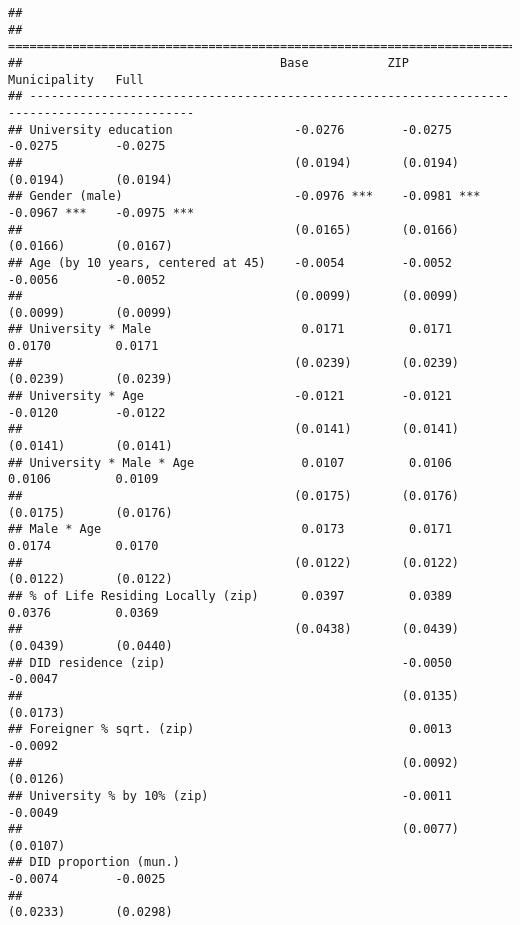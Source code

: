 \documentclass[
]{article}
\begin{document}
\begin{verbatim}
## 
## =============================================================================================
##                                    Base           ZIP            Municipality   Full         
## ---------------------------------------------------------------------------------------------
## University education                 -0.0276        -0.0275        -0.0275        -0.0275    
##                                      (0.0194)       (0.0194)       (0.0194)       (0.0194)   
## Gender (male)                        -0.0976 ***    -0.0981 ***    -0.0967 ***    -0.0975 ***
##                                      (0.0165)       (0.0166)       (0.0166)       (0.0167)   
## Age (by 10 years, centered at 45)    -0.0054        -0.0052        -0.0056        -0.0052    
##                                      (0.0099)       (0.0099)       (0.0099)       (0.0099)   
## University * Male                     0.0171         0.0171         0.0170         0.0171    
##                                      (0.0239)       (0.0239)       (0.0239)       (0.0239)   
## University * Age                     -0.0121        -0.0121        -0.0120        -0.0122    
##                                      (0.0141)       (0.0141)       (0.0141)       (0.0141)   
## University * Male * Age               0.0107         0.0106         0.0106         0.0109    
##                                      (0.0175)       (0.0176)       (0.0175)       (0.0176)   
## Male * Age                            0.0173         0.0171         0.0174         0.0170    
##                                      (0.0122)       (0.0122)       (0.0122)       (0.0122)   
## % of Life Residing Locally (zip)      0.0397         0.0389         0.0376         0.0369    
##                                      (0.0438)       (0.0439)       (0.0439)       (0.0440)   
## DID residence (zip)                                 -0.0050                       -0.0047    
##                                                     (0.0135)                      (0.0173)   
## Foreigner % sqrt. (zip)                              0.0013                       -0.0092    
##                                                     (0.0092)                      (0.0126)   
## University % by 10% (zip)                           -0.0011                       -0.0049    
##                                                     (0.0077)                      (0.0107)   
## DID proportion (mun.)                                              -0.0074        -0.0025    
##                                                                    (0.0233)       (0.0298)   

\end{verbatim}
\end{document}
